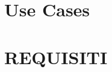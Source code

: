 \newpage

\section{Use Cases}\label{sec:use_cases}









\section{REQUISITI}\label{sec:requisiti}


